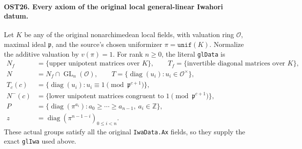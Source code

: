 \paragraph{OST26. Every axiom of the original local general-linear Iwahori datum.}
\label{claim:OST26}
Let $K$ be any of the original nonarchimedean local fields, with
valuation ring $\mathcal O$, maximal ideal $\mathfrak p$, and the
source's chosen uniformizer $\pi=\texttt{unif}(K)$.  Normalize the
additive valuation by $v(\pi)=1$.  For rank $n\geq0$, the literal
\texttt{glData} is
\begin{align*}
 N_f&=\{\text{upper unipotent matrices over }K\},\qquad
 T_f=\{\text{invertible diagonal matrices over }K\},\\
 N&=N_f\cap\operatorname{GL}_n(\mathcal O),\qquad
 T=\{\operatorname{diag}(u_i):u_i\in\mathcal O^\times\},\\
 T_c(c)&=\{\operatorname{diag}(u_i):u_i\equiv1
                                  \pmod{\mathfrak p^{c+1}}\},\\
 N^-(c)&=\{\text{lower unipotent matrices congruent to }1
                                  \pmod{\mathfrak p^{c+1}}\},\\
 P&=\{\operatorname{diag}(\pi^{a_i}):a_0\geq\cdots\geq a_{n-1},
                                      \ a_i\in\mathbb Z\},\\
 z&=\operatorname{diag}(\pi^{n-1-i})_{0\leq i<n}.
\end{align*}
These actual groups satisfy all the original \texttt{IwaData.Ax}
fields, so they supply the exact \texttt{glIwa} used above.
